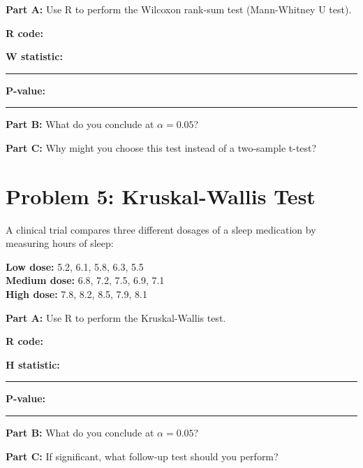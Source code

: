 \documentclass[11pt]{article}
\begin{document}
\vspace{6pt}

\textbf{Part A:} Use R to perform the Wilcoxon rank-sum test (Mann-Whitney U test).

\textbf{R code:}

\vspace{2.5cm}

\textbf{W statistic:} \rule{3cm}{0.4pt} \quad \textbf{P-value:} \rule{3cm}{0.4pt}

\vspace{0.3cm}

\textbf{Part B:} What do you conclude at $\alpha = 0.05$?

\vspace{1cm}

\textbf{Part C:} Why might you choose this test instead of a two-sample t-test?

\vspace{1.5cm}

\newpage

\section{Problem 5: Kruskal-Wallis Test}

A clinical trial compares three different dosages of a sleep medication by measuring hours of sleep:

\begin{center}
\textbf{Low dose:} 5.2, 6.1, 5.8, 6.3, 5.5\\
\textbf{Medium dose:} 6.8, 7.2, 7.5, 6.9, 7.1\\
\textbf{High dose:} 7.8, 8.2, 8.5, 7.9, 8.1
\end{center}

\vspace{6pt}

\textbf{Part A:} Use R to perform the Kruskal-Wallis test.

\textbf{R code:}

\vspace{3cm}

\textbf{H statistic:} \rule{3cm}{0.4pt} \quad \textbf{P-value:} \rule{3cm}{0.4pt}

\vspace{0.3cm}

\textbf{Part B:} What do you conclude at $\alpha = 0.05$?

\vspace{1cm}

\textbf{Part C:} If significant, what follow-up test should you perform?
\end{document}
